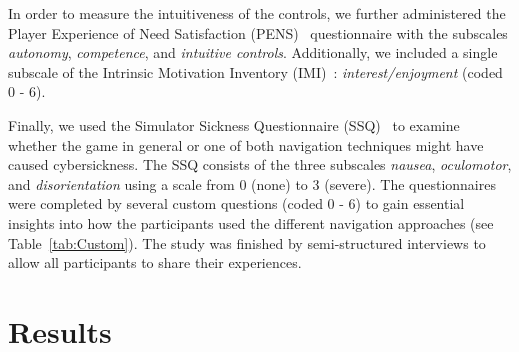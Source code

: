 \documentclass{sigchi}
\begin{document}
In order to measure the intuitiveness of the controls, we further administered the Player Experience of Need Satisfaction (PENS)~\cite{Ryan.2006} questionnaire with the subscales \textit{autonomy}, \textit{competence}, and \textit{intuitive controls}. Additionally, we included a single subscale of the Intrinsic Motivation Inventory (IMI)~\cite{ryan2000self}: \textit{interest/enjoyment} (coded 0 - 6).\par
Finally, we used the Simulator Sickness Questionnaire (SSQ)~\cite{Kennedy.1993} to examine whether the game in general or one of both navigation techniques might have caused cybersickness. The SSQ consists of the three subscales \textit{nausea}, \textit{oculomotor}, and \textit{disorientation} using a scale from 0 (none) to 3 (severe). The questionnaires were completed by several custom questions (coded 0 - 6) to gain essential insights into how the participants used the different navigation approaches (see Table~\ref{tab:Custom}). The study was finished by semi-structured interviews to allow all participants to share their experiences.


\section{Results}
\end{document}
